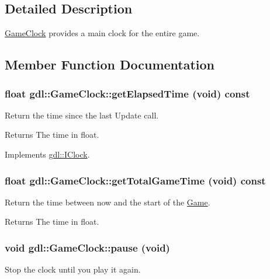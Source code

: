 \subsection{Detailed Description}
\hyperlink{classgdl_1_1GameClock}{GameClock} provides a main clock for the entire game. 

\subsection{Member Function Documentation}
\hypertarget{classgdl_1_1GameClock_a4c089f024d7b1448bc0d24f6a2785281}{
\subsubsection[{getElapsedTime}]{\setlength{\rightskip}{0pt plus 5cm}float gdl::GameClock::getElapsedTime (void) const}}
\label{classgdl_1_1GameClock_a4c089f024d7b1448bc0d24f6a2785281}
Return the time since the last Update call.

\begin{DoxyReturn}{Returns}
The time in float. 
\end{DoxyReturn}


Implements \hyperlink{classgdl_1_1IClock_ad5c3e51562a10e319a3494785d077d1b}{gdl::IClock}.\hypertarget{classgdl_1_1GameClock_a8769e925304d57d6c6949c8bedec7956}{
\subsubsection[{getTotalGameTime}]{\setlength{\rightskip}{0pt plus 5cm}float gdl::GameClock::getTotalGameTime (void) const}}
\label{classgdl_1_1GameClock_a8769e925304d57d6c6949c8bedec7956}
Return the time between now and the start of the \hyperlink{classgdl_1_1Game}{Game}.

\begin{DoxyReturn}{Returns}
The time in float. 
\end{DoxyReturn}
\hypertarget{classgdl_1_1GameClock_aab85df27e686f8dbc0bcdb009a6e9158}{
\subsubsection[{pause}]{\setlength{\rightskip}{0pt plus 5cm}void gdl::GameClock::pause (void)}}
\label{classgdl_1_1GameClock_aab85df27e686f8dbc0bcdb009a6e9158}
Stop the clock until you play it again. 

